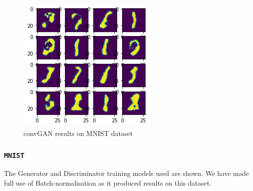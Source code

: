 \documentclass[conference]{IEEEtran}
\begin{document}
\begin{figure}[h]
\centering
\includegraphics[scale = 0.5]{convGAN_MNIST_20epoc.png}
  \caption{convGAN results on MNIST dataset}
\end{figure}

\subsubsection{\texttt{MNIST}}
The Generator and Discriminator training models used are shown. We have made full use of Batch-normalisation as it produced results on this dataset.\\
\end{document}
